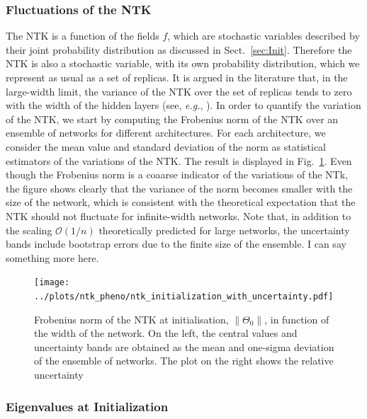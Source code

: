 \subsubsection{Fluctuations of the NTK}
\label{sec:NTKFluctAtInit}

The NTK is a function of the fields $f$, which are stochastic variables described by their joint probability
distribution as discussed in Sect.~\ref{sec:Init}. Therefore the NTK is also a stochastic variable, with 
its own probability distribution, which we represent as usual as a set of replicas. It is argued in the literature that,
in the large-width limit, the variance of the NTK over the set of replicas tends to zero 
with the width of the hidden layers (see, \textit{e.g.}, \cite{Roberts:2021fes}). In order to
quantify the variation of the NTK, we start by computing the Frobenius norm of the NTK over
an ensemble of networks for different architectures. For each architecture, we
consider the mean value and standard deviation of the norm as statistical estimators of the
variations of the NTK. The result is displayed in Fig.~\ref{fig:NTKInit}. Even though the 
Frobenius norm is a coaarse indicator of the variations of the NTk,
the figure shows clearly that the variance of the norm becomes smaller with the size of the
network, which is consistent with the theoretical expectation that the NTK should not 
fluctuate for infinite-width networks. Note that, in addition to the scaling $\mathcal{O}(1/n)$ theoretically
predicted for large networks, the uncertainty bands include bootstrap errors
due to the finite size of the ensemble. \ac{I can say something more here.}

\begin{figure}[ht!]
  \centering
  \texttt{[image: ../plots/ntk\_pheno/ntk\_initialization\_with\_uncertainty.pdf]}
  \caption{Frobenius norm of the NTK at initialisation, $\lVert \Theta_0
  \rVert$, in function of the width of the network. On the left, the central values
  and uncertainty bands are obtained as the mean and one-sigma deviation of the
  ensemble of networks. The plot on the right shows the relative uncertainty }
  \label{fig:NTKInit}
\end{figure}

\FloatBarrier

\subsubsection{Eigenvalues at Initialization}
\label{sec:NTKEigenAtInit}

